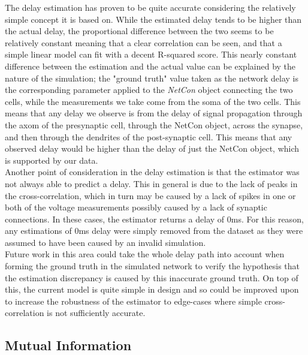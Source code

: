 \documentclass[letterpaper, 10 pt, conference]{ieeeconf}  %
\begin{document}
The delay estimation has proven to be quite accurate considering the relatively simple concept it is based on. While the estimated delay tends to be higher than the actual delay, the proportional difference between the two seems to be relatively constant meaning that a clear correlation can be seen, and that a simple linear model can fit with a decent R-squared score. This nearly constant difference between the estimation and the actual value can be explained by the nature of the simulation; the "ground truth" value taken as the network delay is the corresponding parameter applied to the \emph{NetCon} object connecting the two cells, while the measurements we take come from the soma of the two cells. This means that any delay we observe is from the delay of signal propagation through the axom of the presynaptic cell, through the NetCon object, across the synapse, and then through the dendrites of the post-synaptic cell. This means that any observed delay would be higher than the delay of just the NetCon object, which is supported by our data.\\
Another point of consideration in the delay estimation is that the estimator was not always able to predict a delay. This in general is due to the lack of peaks in the cross-correlation, which in turn may be caused by a lack of spikes in one or both of the voltage measurements possibly caused by a lack of synaptic connections. In these cases, the estimator returns a delay of 0ms. For this reason, any estimations of 0ms delay were simply removed from the dataset as they were assumed to have been caused by an invalid simulation.\\
Future work in this area could take the whole delay path into account when forming the ground truth in the simulated network to verify the hypothesis that the estimation discrepancy is caused by this inaccurate ground truth. On top of this, the current model is quite simple in design and so could be improved upon to increase the robustness of the estimator to edge-cases where simple cross-correlation is not sufficiently accurate.

\subsection*{Mutual Information}
\end{document}
